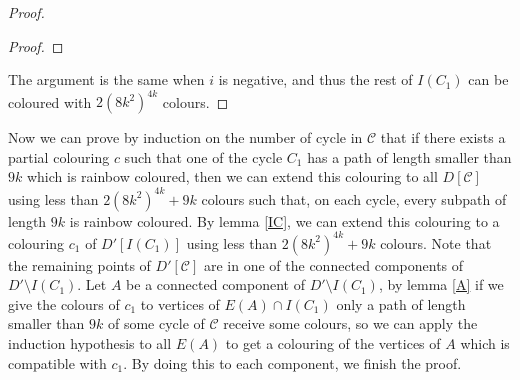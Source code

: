 \documentclass[utf8,10pt]{article}
\theoremstyle{plain}
\theoremstyle{definition}
\theoremstyle{remark}
\begin{document}
\begin{proof}
\begin{proof}
\end{proof}
%
%

The argument is the same when $i$ is negative, and thus the rest of $I(C_1)$ can be coloured with $2(8k^2)^{4k}$ colours.
\end{proof}

Now we can prove by induction on the number of cycle in $\mathcal{C}$ that if there exists
a partial colouring $c$ such that one of the cycle $C_1$ has a path of length smaller than $9k$
which is rainbow coloured, then we can extend this colouring to all $D[\mathcal{C}]$ using less
than $2(8k^2)^{4k} +9k$ colours such that, on each cycle, every subpath of length
$9k$ is rainbow coloured. By lemma \ref{IC}, we can extend this colouring to a colouring $c_1$ of $D'[I(C_1)]$
using less than $2(8k^2)^{4k} + 9k$ colours.
Note that the remaining points of $D'[\mathcal{C}]$ are in one of the connected components of $D'\setminus I(C_1)$.
Let $A$ be a connected component of $D'\setminus I(C_1)$, by lemma \ref{A} if we give the colours of $c_1$ to vertices of $E(A) \cap I(C_1)$
only a path of length smaller than $9k$ of some cycle of $\mathcal{C}$ receive some colours,
so we can apply the induction hypothesis to all $E(A)$ to get a colouring
of the vertices of $A$ which is compatible with $c_1$. By doing this to each component, we finish the proof.
\end{document}
